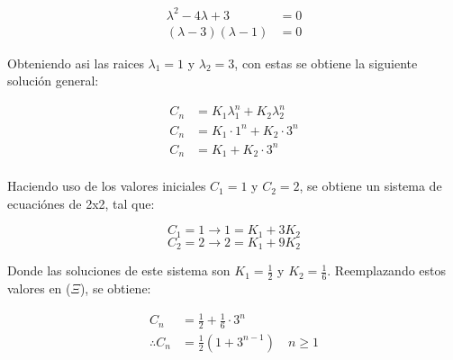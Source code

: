 \begin{align*}
\lambda^{2} -4\lambda + 3 &= 0 \\
(\lambda -3)(\lambda-1) &= 0
\end{align*}

Obteniendo asi las raices $\lambda_1=1$ y $\lambda_2=3$, con estas se obtiene la siguiente solución general:

\begin{align*}
    C_n &= K_1 \lambda_1^n + K_2 \lambda_2^n \\
    C_n &= K_1 \cdot 1^n + K_2 \cdot 3^n \\
    C_n &= K_1+ K_2 \cdot 3^n \tag{$\Xi$} \\
\end{align*}

Haciendo uso de los valores iniciales $C_1=1$ y $C_2=2$, se obtiene un sistema de ecuaciónes de 2x2, tal que:

$$C_1=1 \rightarrow 1 = K_1 + 3K_2$$
$$C_2=2 \rightarrow 2 = K_1 + 9K_2$$

Donde las soluciones de este sistema son $K_1=\frac{1}{2}$ y $K_2=\frac{1}{6}$. Reemplazando estos valores en ($\Xi$), se obtiene:

\begin{align*}
    C_n &= \frac{1}{2} + \frac{1}{6} \cdot 3^n \\
    \therefore C_n &= \frac{1}{2} (1 + 3^{n-1}) \quad n \ge 1
\end{align*}
